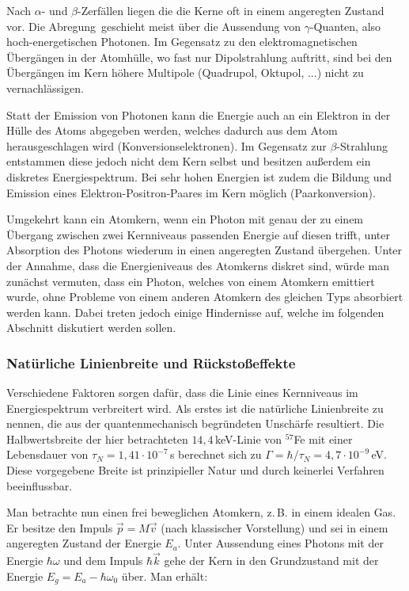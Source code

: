 \documentclass[
a4paper,                %
titlepage=firstiscover, %
captions=tableheading,  %
toc=bibliography,       %
toc=listof,             %
oneside,                %
automark,               %
12pt,                   %
english, ngerman,       %
parskip = half,         %
]{scrartcl}
\begin{document}
Nach $\alpha$- und $\beta$-Zerfällen liegen die die Kerne oft in einem angeregten Zustand vor.
Die \glqq Abregung\grqq\ geschieht meist über die Aussendung von $\gamma$-Quanten, also hoch-energetischen Photonen.
Im Gegensatz zu den elektromagnetischen Übergängen in der Atomhülle, wo fast nur Dipolstrahlung auftritt, sind bei den Übergängen im Kern höhere Multipole (Quadrupol, Oktupol, ...) nicht zu vernachlässigen. 

Statt der Emission von Photonen kann die Energie auch an ein Elektron in der Hülle des Atoms abgegeben werden, welches dadurch aus dem Atom herausgeschlagen wird (Konversionselektronen).
Im Gegensatz zur $\beta$-Strahlung entstammen diese jedoch nicht dem Kern selbst und besitzen außerdem ein diskretes Energiespektrum.
Bei sehr hohen Energien ist zudem die Bildung und Emission eines Elektron-Positron-Paares im Kern möglich (Paarkonversion).

Umgekehrt kann ein Atomkern, wenn ein Photon mit genau der zu einem Übergang zwischen zwei Kernniveaus passenden Energie auf diesen trifft, unter Absorption des Photons wiederum in einen angeregten Zustand übergehen.
Unter der Annahme, dass die Energieniveaus des Atomkerns diskret sind, würde man zunächst vermuten, dass ein Photon, welches von einem Atomkern emittiert wurde, ohne Probleme von einem anderen Atomkern des gleichen Typs absorbiert werden kann.
Dabei treten jedoch einige Hindernisse auf, welche im folgenden Abschnitt diskutiert werden sollen.


\subsubsection{Natürliche Linienbreite und Rückstoßeffekte}

Verschiedene Faktoren sorgen dafür, dass die Linie eines Kernniveaus im Energiespektrum verbreitert wird.
Als erstes ist die natürliche Linienbreite zu nennen, die aus der quantenmechanisch begründeten Unschärfe resultiert.
Die Halbwertsbreite der hier betrachteten $14,4\,$keV-Linie von $^{57}$Fe mit einer Lebensdauer von $\tau_N=1,41\cdot 10^{-7}\,$s berechnet sich zu $\Gamma = \hbar/\tau_N=4,7\cdot10^{-9}\,$eV.
Diese vorgegebene Breite ist prinzipieller Natur und durch keinerlei Verfahren beeinflussbar.

Man betrachte nun einen frei beweglichen Atomkern, z.\,B. in einem idealen Gas.
Er besitze den Impuls $\vec{p}=M\vec{v}$ (nach klassischer Vorstellung) und sei in einem angeregten Zustand der Energie $E_a$.
Unter Aussendung eines Photons mit der Energie $\hbar \omega$ und dem Impuls $\hbar \vec{k}$ gehe der Kern in den Grundzustand mit der Energie $E_g = E_a -\hbar\omega_0$ über.
Man erhält:
\end{document}
